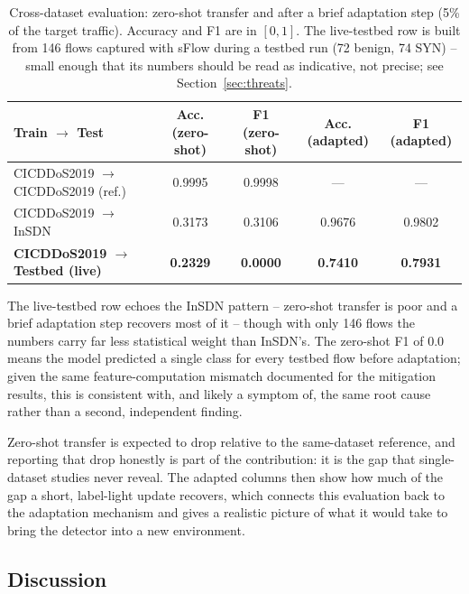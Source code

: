 \documentclass[ASNA,twocolumn]{USG} %
\begin{document}
\begin{table}[hbt!]
\centering
\caption{Cross-dataset evaluation: zero-shot transfer and after a brief adaptation step (5\% of the target traffic). Accuracy and F1 are in $[0,1]$. The live-testbed row is built from 146 flows captured with sFlow during a testbed run (72 benign, 74 SYN) -- small enough that its numbers should be read as indicative, not precise; see Section~\ref{sec:threats}.}
\label{tab:cross_dataset_results}
\renewcommand{\arraystretch}{1.2}
\begin{tabular}{|p{4.5cm}|c|c|c|c|}
\hline
\textbf{Train $\rightarrow$ Test} & \textbf{Acc. (zero-shot)} & \textbf{F1 (zero-shot)} & \textbf{Acc. (adapted)} & \textbf{F1 (adapted)} \\
\hline
CICDDoS2019 $\rightarrow$ CICDDoS2019 (ref.) & 0.9995 & 0.9998 & --- & --- \\ \hline
CICDDoS2019 $\rightarrow$ InSDN & 0.3173 & 0.3106 & 0.9676 & 0.9802 \\ \hline
\rowcolor{gray!20}
\textbf{CICDDoS2019 $\rightarrow$ Testbed (live)} & \textbf{0.2329} & \textbf{0.0000} & \textbf{0.7410} & \textbf{0.7931} \\ \hline
\end{tabular}
\end{table}

The live-testbed row echoes the InSDN pattern -- zero-shot transfer is poor and a brief adaptation step recovers most of it -- though with only 146 flows the numbers carry far less statistical weight than InSDN's. The zero-shot F1 of 0.0 means the model predicted a single class for every testbed flow before adaptation; given the same feature-computation mismatch documented for the mitigation results, this is consistent with, and likely a symptom of, the same root cause rather than a second, independent finding.

Zero-shot transfer is expected to drop relative to the same-dataset reference, and reporting that drop honestly is part of the contribution: it is the gap that single-dataset studies never reveal. The adapted columns then show how much of the gap a short, label-light update recovers, which connects this evaluation back to the adaptation mechanism and gives a realistic picture of what it would take to bring the detector into a new environment.

\subsection{Discussion}
\end{document}
